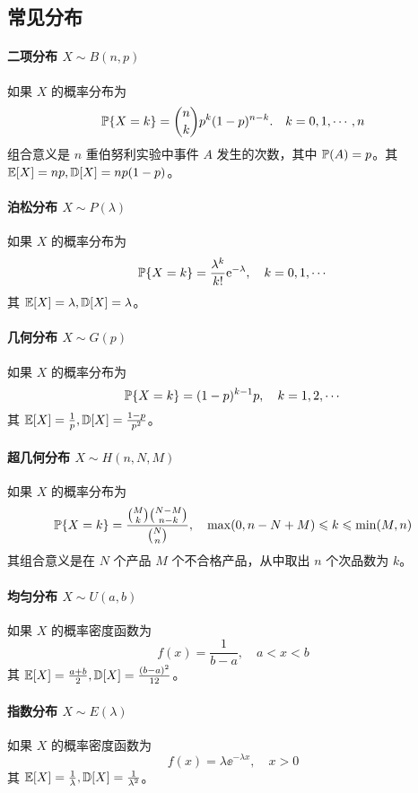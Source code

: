 \subsection{常见分布}

\paragraph{二项分布 $X \sim B(n, p)$}
如果 $X$ 的概率分布为
\[ \mathbb{P}\{X = k\} = \binom{n}{k} p^k(1 - p)^{n-k}. \quad k = 0, 1, \cdots, n \]
组合意义是 $n$ 重伯努利实验中事件 $A$ 发生的次数，其中 $\mathbb{P}(A) = p$。其 $\mathbb{E} [X] = np, \mathbb{D} [X] = np(1-p)$。

\paragraph{泊松分布 $X \sim P(\lambda)$}
如果 $X$ 的概率分布为
\[ \mathbb{P}\{X = k\} = \frac{\lambda^k}{k!} \mathrm{e}^{-\lambda} , \quad k = 0, 1, \cdots \]
其 $\mathbb{E} [X] = \lambda, \mathbb{D} [X] = \lambda$。


\paragraph{几何分布 $X \sim G(p)$}
如果 $X$ 的概率分布为
\[ \mathbb{P}\{X=k\} = (1 - p)^{k-1}p, \quad k = 1, 2, \cdots \]
其 $\mathbb{E} [X] = \frac{1}{p}, \mathbb{D} [X] = \frac{1-p}{p^2}$。

\paragraph{超几何分布 $X \sim H(n, N, M)$}
如果 $X$ 的概率分布为
\[ \mathbb{P}\{X = k\} = \frac{\binom{M}{k} \binom{N - M}{n - k}}{\binom{N}{n}}, \quad \max(0, n - N + M) \leqslant k \leqslant \min(M, n) \]
其组合意义是在 $N$ 个产品 $M$ 个不合格产品，从中取出 $n$ 个次品数为 $k$。

\paragraph{均匀分布 $X \sim U(a, b)$}
如果 $X$ 的概率密度函数为
\[ f(x) = \frac{1}{b - a}, \quad a < x < b \]
其 $\mathbb{E} [X] = \frac{a+b}{2}, \mathbb{D} [X] = \frac{(b-a)^2}{12}$。

\paragraph{指数分布 $X \sim E(\lambda)$}
如果 $X$ 的概率密度函数为
\[ f(x) = \lambda \ee^{-\lambda x}, \quad x > 0 \]
其 $\mathbb{E} [X] = \frac{1}{\lambda}, \mathbb{D} [X] = \frac{1}{\lambda^2}$。

